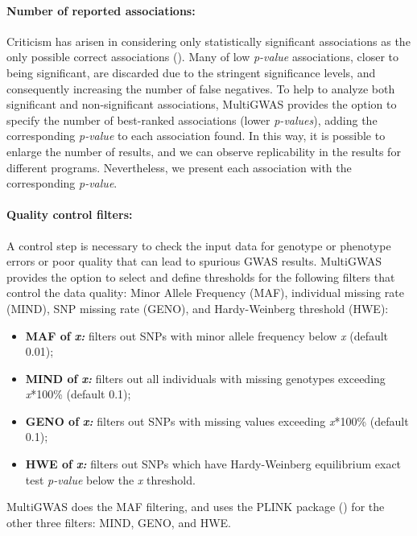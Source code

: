 \documentclass{article}
\begin{document}
\paragraph{Number of reported associations: }

Criticism has arisen in considering only statistically significant associations as the only possible correct associations (\cite{Thomson2011,Kaler2019}). Many of low \emph{p-value} associations, closer to being significant, are discarded due to the stringent significance levels, and consequently increasing the number of false negatives. To help to analyze both significant and non-significant associations, MultiGWAS provides the option to specify the number of best-ranked associations (lower \emph{p-values}), adding the corresponding \emph{p-value} to each association found. In this way, it is possible to enlarge the number of results, and we can observe replicability in the results for different programs. Nevertheless, we present each association with the corresponding \emph{p-value}.


\paragraph{Quality control filters:}

A control step is necessary to check the input data for genotype or phenotype errors or poor quality that can lead to spurious GWAS results. MultiGWAS provides the option to select and define thresholds for the following filters that control the data quality: Minor Allele Frequency (MAF), individual missing rate (MIND), SNP missing rate (GENO), and Hardy-Weinberg threshold (HWE):
\begin{itemize}
\item \textbf{MAF of }\textbf{\emph{x:}} filters out SNPs with minor allele frequency below \emph{x} (default 0.01); 
\item \textbf{MIND of }\textbf{\emph{x:}} filters out all individuals with missing genotypes exceeding \emph{x}{*}100\% (default 0.1); 
\item \textbf{GENO of }\textbf{\emph{x:}} filters out SNPs with missing values exceeding \emph{x}{*}100\% (default 0.1); 
\item \textbf{HWE of }\textbf{\emph{x:}} filters out SNPs which have Hardy-Weinberg equilibrium exact test \emph{p-value} below the \emph{x} threshold.
\end{itemize}
MultiGWAS does the MAF filtering, and uses the PLINK package (\cite{Gumpinger2018}) for the other three filters: MIND, GENO, and HWE.
\end{document}

